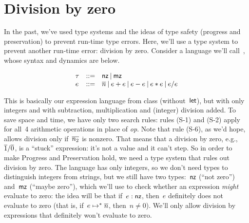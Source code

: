 \documentclass{article}
\begin{document}
\section{Division by zero}

In the past, we've used type systems and the ideas of type safety (progress
and preservation) to prevent run-time type errors.
%
Here, we'll use a type system to prevent another run-time error: division by
zero.
%
Consider a language we'll call~\ezlang{}, whose syntax and dynamics are below.

{
  \centering
  \[
  \begin{array}{l l l}
    \tau & \mathop{::=} & \mathsf{nz} \mathbin{|} \mathsf{mz}\\
    e & \mathop{::=} &
    \overline{n} \mathbin{|}
    e + e \mathbin{|}
    e - e \mathbin{|}
    e * e \mathbin{|}
    e / e
  \end{array}
  \]
}

{
  \centering
  \def \MathparLineskip {\lineskip=0.43cm}
}

This is basically our expression language {\elang} from class
(without~$\mathsf{let}$), but with only integers and with subtraction,
multiplication and (integer) division added.
%
To save space and time, we have only two search rules: rules (S-1) and
(S-2) apply for all~4 arithmetic operations in place of \textit{op}.
%
Note that rule (S-6), as we'd hope, allows division only if~$\overline{n_2}$ is
nonzero.
%
That means that a division by zero, e.g.,~$\overline{1} / \overline{0}$, is a ``stuck''
expression: it's not a value and it can't step.
%
So in order to make Progress and Preservation hold, we need a type system
that rules out division by zero.
%
The {\ezlang} language has only integers, so we don't need types to
distinguish integers from strings, but we still have two
types:~$\mathsf{nz}$ (``not zero'') and~$\mathsf{mz}$ (``maybe zero''), which we'll use to
check whether an expression {\em might} evaluate to zero: the idea will be
that if~$e : \mathsf{nz}$, then~$e$ definitely does not evaluate to zero
(that is, if~$e \mapsto^* \overline{n}$, then~$n \neq 0$).
%
We'll only allow division by expressions that definitely won't evaluate to
zero.
\end{document}

